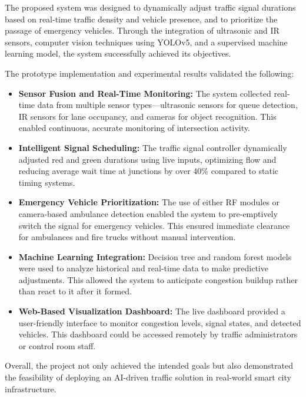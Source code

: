 \documentclass[12pt]{report}
\begin{document}
The proposed system was designed to dynamically adjust traffic signal durations based on real-time traffic density and vehicle presence, and to prioritize the passage of emergency vehicles. Through the integration of ultrasonic and IR sensors, computer vision techniques using YOLOv5, and a supervised machine learning model, the system successfully achieved its objectives.

The prototype implementation and experimental results validated the following:

\begin{itemize}
    \item \textbf{Sensor Fusion and Real-Time Monitoring:} The system collected real-time data from multiple sensor types—ultrasonic sensors for queue detection, IR sensors for lane occupancy, and cameras for object recognition. This enabled continuous, accurate monitoring of intersection activity.
    
    \item \textbf{Intelligent Signal Scheduling:} The traffic signal controller dynamically adjusted red and green durations using live inputs, optimizing flow and reducing average wait time at junctions by over 40\% compared to static timing systems.
    
    \item \textbf{Emergency Vehicle Prioritization:} The use of either RF modules or camera-based ambulance detection enabled the system to pre-emptively switch the signal for emergency vehicles. This ensured immediate clearance for ambulances and fire trucks without manual intervention.
    
    \item \textbf{Machine Learning Integration:} Decision tree and random forest models were used to analyze historical and real-time data to make predictive adjustments. This allowed the system to anticipate congestion buildup rather than react to it after it formed.
    
    \item \textbf{Web-Based Visualization Dashboard:} The live dashboard provided a user-friendly interface to monitor congestion levels, signal states, and detected vehicles. This dashboard could be accessed remotely by traffic administrators or control room staff.
\end{itemize}

Overall, the project not only achieved the intended goals but also demonstrated the feasibility of deploying an AI-driven traffic solution in real-world smart city infrastructure.
\end{document}

